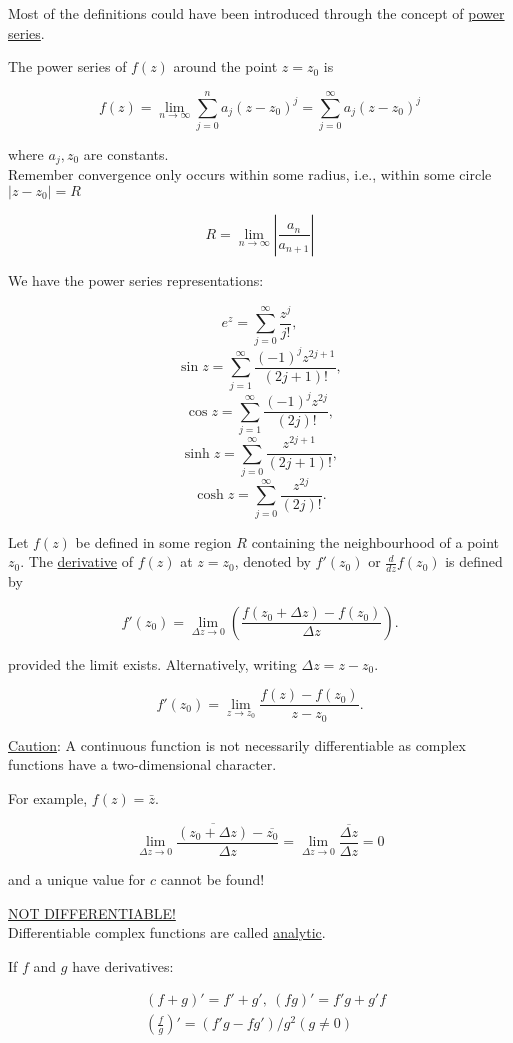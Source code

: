 \documentclass[twoside]{article}
\newcommand*\mean[1]{\bar{#1}}
\begin{document}
Most of the definitions could have been introduced through the concept of \underline{power series}.

The power series of $f(z)$ around the point $z=z_0$ is 

$$f(z)=\lim_{n\to \infty}\sum^n_{j=0}a_j(z-z_0)^j=\sum^\infty_{j=0}a_j(z-z_0)^j$$

where $a_j, z_0$ are constants.\\

Remember convergence only occurs within some radius, i.e., within some circle $\lvert z-z_0\rvert =R$

$$R=\lim_{n\to\infty}\left\lvert\frac{a_n}{a_{n+1}}\right\rvert$$

We have the power series representations:

$$e^z=\sum^\infty_{j=0}\frac{z^j}{j!},$$
$$\sin z=\sum^\infty_{j=1}\frac{(-1)^jz^{2j+1}}{(2j+1)!},$$
$$\cos z=\sum^\infty_{j=1}\frac{(-1)^jz^{2j}}{(2j)!},$$
$$\sinh z=\sum^\infty_{j=0}\frac{z^{2j+1}}{(2j+1)!},$$
$$\cosh z=\sum^\infty_{j=0}\frac{z^{2j}}{(2j)!}.$$

Let $f(z)$ be defined in some region $R$ containing the neighbourhood of a point $z_0$. The \underline{derivative} of $f(z)$ at $z=z_0$, denoted by $f'(z_0)$ or $\frac{d}{dz}f(z_0)$ is defined by

$$f'(z_0)=\lim_{\Delta z\to 0}\left(\frac{f(z_0+\Delta z)-f(z_0)}{\Delta z}\right).$$

provided the limit exists. Alternatively, writing $\Delta z = z- z_0$.

$$f'(z_0)=\lim_{z\to z_0}\frac{f(z)-f(z_0)}{z-z_0}.$$

\underline{Caution}: A continuous function is not necessarily differentiable as complex functions have a two-dimensional character.

For example, $f(z)=\mean{z}$.

$$\lim_{\Delta z\to 0}\frac{\overline{(z_0+\Delta z)}-\overline{z_0}}{\Delta z}=\lim_{\Delta z\to 0}\frac{\overline{\Delta z}}{\Delta z}=0$$

and a unique value for $c$ cannot be found!

\underline{NOT DIFFERENTIABLE!}\\

Differentiable complex functions are called \underline{analytic}.

If $f$ and $g$ have derivatives:

\begin{equation}
	\begin{split}
		&(f+g)'=f'+g',\ (fg)'=f'g+g'f\\
		&\left(\frac{f}{g}\right)'=(f'g-fg')/g^2 (g\not=0)
	\end{split}
\end{equation}
\end{document}
